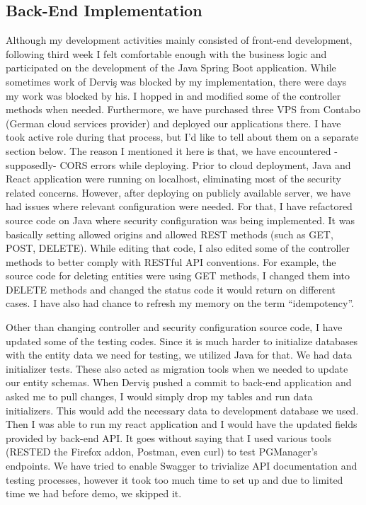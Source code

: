 \subsection{Back-End Implementation}
Although my development activities mainly consisted of front-end development, 
following third week I felt comfortable enough with the business logic and 
participated on the development of the Java Spring Boot application. While 
sometimes work of Derviş was blocked by my implementation, there were days 
my work was blocked by his. I hopped in and modified some of the controller 
methods when needed. Furthermore, we have purchased three VPS from Contabo 
(German cloud services provider) and deployed our applications there. I have 
took active role during that process, but I'd like to tell about them on a 
separate section below. The reason I mentioned it here is that, we have 
encountered -supposedly- CORS errors while deploying. Prior to cloud 
deployment, Java and React application were running on localhost, eliminating 
most of the security related concerns. However, after deploying on publicly 
available server, we have had issues where relevant configuration were needed. 
For that, I have refactored source code on Java where security configuration 
was being implemented. It was basically setting allowed origins and allowed 
REST methods (such as GET, POST, DELETE). While editing that code, I also 
edited some of the controller methods to better comply with RESTful API 
conventions. For example, the source code for deleting entities were using 
GET methods, I changed them into DELETE methods and changed the status code 
it would return on different cases. I have also had chance to refresh my 
memory on the term ``idempotency''.
\par
Other than changing controller and security configuration source code, I have 
updated some of the testing codes. Since it is much harder to initialize 
databases with the entity data we need for testing, we utilized Java for that. 
We had data initializer tests. These also acted as migration tools when we 
needed to update our entity schemas. When Derviş pushed a commit to back-end 
application and asked me to pull changes, I would simply drop my tables and 
run data initializers. This would add the necessary data to development 
database we used. Then I was able to run my react application and I would 
have the updated fields provided by back-end API. It goes without saying that 
I used various tools (RESTED the Firefox addon, Postman, even curl) to test 
PGManager's endpoints. We have tried to enable Swagger to trivialize API 
documentation and testing processes, however it took too much time to set up 
and due to limited time we had before demo, we skipped it.
